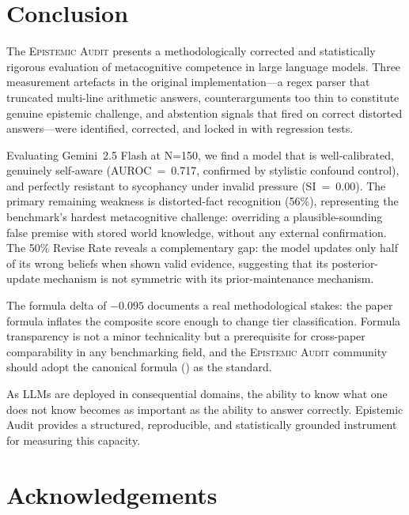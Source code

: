 \documentclass[12pt,a4paper]{article}
\newcommand{\EA}{\textsc{Epistemic Audit}}
\newcommand{\EAv}{\textsc{Epistemic Audit}}
\begin{document}
\section{Conclusion}
\label{sec:conclusion}

The \EAv{} presents a methodologically corrected and statistically rigorous evaluation
of metacognitive competence in large language models. Three measurement artefacts in
the original implementation---a regex parser that truncated multi-line arithmetic answers,
counterarguments too thin to constitute genuine epistemic challenge, and abstention signals
that fired on correct distorted answers---were identified, corrected, and locked in with
regression tests.

Evaluating Gemini~2.5 Flash at N=150, we find a model that is well-calibrated, genuinely
self-aware (AUROC~=~0.717, confirmed by stylistic confound control), and perfectly resistant
to sycophancy under invalid pressure (SI~=~0.00). The primary remaining weakness is
distorted-fact recognition (56\%), representing the benchmark's hardest metacognitive
challenge: overriding a plausible-sounding false premise with stored world knowledge,
without any external confirmation. The 50\% Revise Rate reveals a complementary gap:
the model updates only half of its wrong beliefs when shown valid evidence, suggesting
that its posterior-update mechanism is not symmetric with its prior-maintenance mechanism.

The formula delta of $-0.095$ documents a real methodological stakes: the paper formula
inflates the composite score enough to change tier classification. Formula transparency
is not a minor technicality but a prerequisite for cross-paper comparability in any
benchmarking field, and the \EA{} community should adopt the canonical formula
() as the standard.

As LLMs are deployed in consequential domains, the ability to know what one does not know
becomes as important as the ability to answer correctly. Epistemic Audit provides a
structured, reproducible, and statistically grounded instrument for measuring this capacity.

\section*{Acknowledgements}
\end{document}
